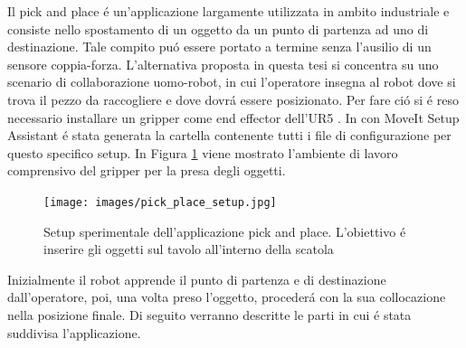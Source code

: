 Il pick and place \'{e} un'applicazione largamente utilizzata in ambito industriale e consiste nello spostamento di un oggetto 
da un punto di partenza ad uno di destinazione. Tale compito pu\'{o} essere portato a termine senza l'ausilio di un sensore 
coppia-forza. L'alternativa proposta in questa tesi si concentra su uno scenario di collaborazione uomo-robot, in cui l'operatore 
insegna al robot dove si trova il pezzo da raccogliere e dove dovr\'{a} essere posizionato. 
Per fare ci\'{o} si \'{e} reso necessario installare un gripper come end effector 
dell'UR5 \cite{gripper_repo}. In \cite{environment_setup} con MoveIt Setup Assistant \'{e} stata generata la cartella contenente 
tutti i file di configurazione per questo specifico setup. 
In Figura \ref{fig:pick_place} viene mostrato l'ambiente di lavoro comprensivo del gripper per la presa degli oggetti. 
\begin{figure}[H]
    \centering
    \texttt{[image: images/pick\_place\_setup.jpg]}
    \caption{Setup sperimentale dell'applicazione pick and place. L'obiettivo \'{e} inserire gli oggetti sul tavolo 
    all'interno della scatola}
    \label{fig:pick_place}
\end{figure}
Inizialmente il robot apprende il punto di partenza e di destinazione dall'operatore, poi, una volta preso l'oggetto, 
proceder\'{a} con la sua collocazione nella posizione finale.
Di seguito verranno descritte le parti in cui \'{e} stata suddivisa l'applicazione.
